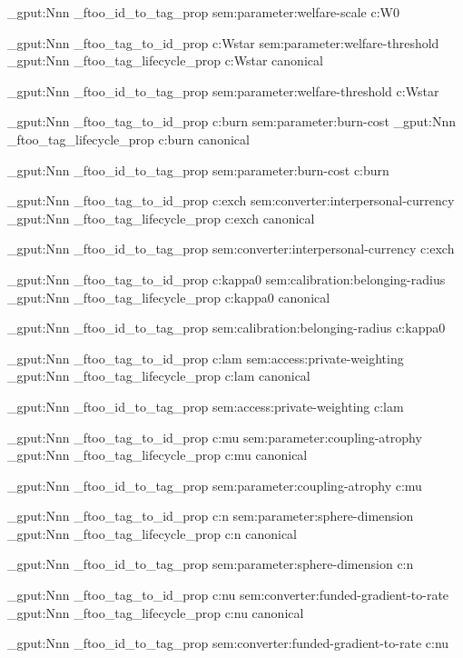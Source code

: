 \prop_gput:Nnn \g_ftoo_id_to_tag_prop { sem:parameter:welfare-scale } { c:W0 }


\prop_gput:Nnn \g_ftoo_tag_to_id_prop { c:Wstar } { sem:parameter:welfare-threshold }
\prop_gput:Nnn \g_ftoo_tag_lifecycle_prop { c:Wstar } { canonical }

\prop_gput:Nnn \g_ftoo_id_to_tag_prop { sem:parameter:welfare-threshold } { c:Wstar }


\prop_gput:Nnn \g_ftoo_tag_to_id_prop { c:burn } { sem:parameter:burn-cost }
\prop_gput:Nnn \g_ftoo_tag_lifecycle_prop { c:burn } { canonical }

\prop_gput:Nnn \g_ftoo_id_to_tag_prop { sem:parameter:burn-cost } { c:burn }


\prop_gput:Nnn \g_ftoo_tag_to_id_prop { c:exch } { sem:converter:interpersonal-currency }
\prop_gput:Nnn \g_ftoo_tag_lifecycle_prop { c:exch } { canonical }

\prop_gput:Nnn \g_ftoo_id_to_tag_prop { sem:converter:interpersonal-currency } { c:exch }


\prop_gput:Nnn \g_ftoo_tag_to_id_prop { c:kappa0 } { sem:calibration:belonging-radius }
\prop_gput:Nnn \g_ftoo_tag_lifecycle_prop { c:kappa0 } { canonical }

\prop_gput:Nnn \g_ftoo_id_to_tag_prop { sem:calibration:belonging-radius } { c:kappa0 }


\prop_gput:Nnn \g_ftoo_tag_to_id_prop { c:lam } { sem:access:private-weighting }
\prop_gput:Nnn \g_ftoo_tag_lifecycle_prop { c:lam } { canonical }

\prop_gput:Nnn \g_ftoo_id_to_tag_prop { sem:access:private-weighting } { c:lam }


\prop_gput:Nnn \g_ftoo_tag_to_id_prop { c:mu } { sem:parameter:coupling-atrophy }
\prop_gput:Nnn \g_ftoo_tag_lifecycle_prop { c:mu } { canonical }

\prop_gput:Nnn \g_ftoo_id_to_tag_prop { sem:parameter:coupling-atrophy } { c:mu }


\prop_gput:Nnn \g_ftoo_tag_to_id_prop { c:n } { sem:parameter:sphere-dimension }
\prop_gput:Nnn \g_ftoo_tag_lifecycle_prop { c:n } { canonical }

\prop_gput:Nnn \g_ftoo_id_to_tag_prop { sem:parameter:sphere-dimension } { c:n }


\prop_gput:Nnn \g_ftoo_tag_to_id_prop { c:nu } { sem:converter:funded-gradient-to-rate }
\prop_gput:Nnn \g_ftoo_tag_lifecycle_prop { c:nu } { canonical }

\prop_gput:Nnn \g_ftoo_id_to_tag_prop { sem:converter:funded-gradient-to-rate } { c:nu }


